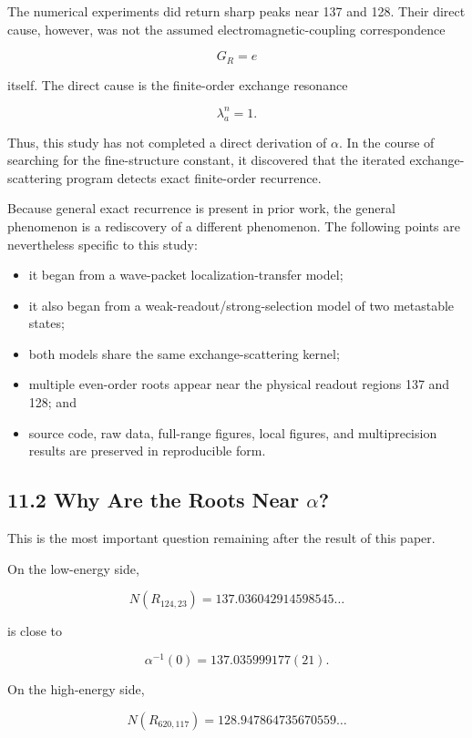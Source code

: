 \documentclass[
  10pt,
  a4paper,
]{article}
\providecommand{\tightlist}{%
  \setlength{\itemsep}{0pt}\setlength{\parskip}{0pt}}
\begin{document}
The numerical experiments did return sharp peaks near 137 and 128. Their
direct cause, however, was not the assumed electromagnetic-coupling
correspondence

\[
G_R=e
\]

itself. The direct cause is the finite-order exchange resonance

\[
\lambda_a^n=1.
\]

Thus, this study has not completed a direct derivation of \(\alpha\). In
the course of searching for the fine-structure constant, it discovered
that the iterated exchange-scattering program detects exact finite-order
recurrence.

Because general exact recurrence is present in prior work, the general
phenomenon is a rediscovery of a different phenomenon. The following
points are nevertheless specific to this study:

\begin{itemize}
\tightlist
\item
  it began from a wave-packet localization-transfer model;
\item
  it also began from a weak-readout/strong-selection model of two
  metastable states;
\item
  both models share the same exchange-scattering kernel;
\item
  multiple even-order roots appear near the physical readout regions 137
  and 128; and
\item
  source code, raw data, full-range figures, local figures, and
  multiprecision results are preserved in reproducible form.
\end{itemize}

\subsection{\texorpdfstring{11.2 Why Are the Roots Near
\(\alpha\)?}{11.2 Why Are the Roots Near \textbackslash alpha?}}\label{why-are-the-roots-near-alpha}

This is the most important question remaining after the result of this
paper.

On the low-energy side,

\[
N(R_{124,23})
=137.036042914598545\ldots
\]

is close to

\[
\alpha^{-1}(0)
=137.035999177(21).
\]

On the high-energy side,

\[
N(R_{620,117})
=128.947864735670559\ldots
\]
\end{document}
